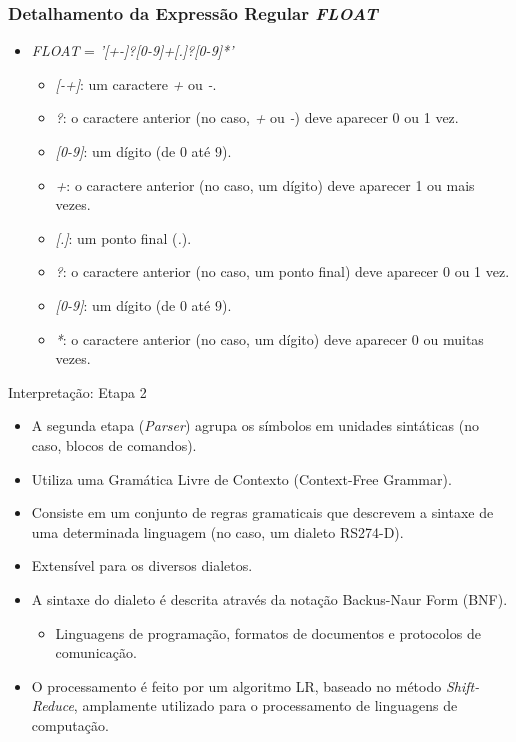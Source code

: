 \documentclass[aspectratio=169]{beamer}
\begin{document}
{  \begin{frame}
    \frametitle{Detalhamento da Expressão Regular \emph{FLOAT}}
    \begin{itemize}
      \item \emph{FLOAT} = \emph{'[+-]?[0-9]+[.]?[0-9]*'}
        \begin{itemize}
          \item \emph{[-+]}: um caractere \emph{+} ou \emph{-}.
          \item \emph{?}: o caractere anterior (no caso, \emph{+} ou \emph{-}) deve aparecer 0 ou 1 vez.
          \item \emph{[0-9]}: um dígito (de 0 até 9).
          \item \emph{+}: o caractere anterior (no caso, um dígito) deve aparecer 1 ou mais vezes.
          \item \emph{[.]}: um ponto final (\emph{.}).
          \item \emph{?}: o caractere anterior (no caso, um ponto final) deve aparecer 0 ou 1 vez.
          \item \emph{[0-9]}: um dígito (de 0 até 9).
          \item \emph{*}: o caractere anterior (no caso, um dígito) deve aparecer 0 ou muitas vezes.
      \end{itemize}
    \end{itemize}
\end{frame}


\begin{frame}{Interpretação: Etapa 2}
  \begin{itemize}
    \item A segunda etapa (\emph{Parser}) agrupa os símbolos em unidades sint\'aticas (no caso, blocos de comandos).
    \item Utiliza uma Gramática Livre de Contexto (Context-Free Grammar).
    \item Consiste em um conjunto de regras gramaticais que descrevem a sintaxe de uma
    determinada linguagem (no caso, um dialeto RS274-D).
    \item Extensível para os diversos dialetos.
    \item A sintaxe do dialeto é descrita através da notação Backus-Naur Form (BNF).
    \begin{itemize}
      \item Linguagens de programação, formatos de documentos e protocolos de comunicação.
    \end{itemize}
    \item O processamento é feito por um algoritmo LR, baseado no método \emph{Shift-Reduce},
    amplamente utilizado para o processamento de linguagens de computação.
  \end{itemize}
\end{frame}


}
\end{document}
